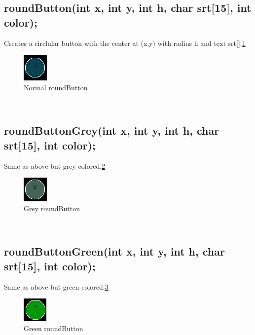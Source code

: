 \documentclass{article}
\begin{document}
\subsection{roundButton(int x, int y, int h, char srt[15], int color);}
Creates a circlular button with the center at (x,y) with radius h and text srt[].\ref{roundbutton}\\
\begin{figure}[htp]
  \begin{center}
\includegraphics[]{roundbutton}
  \end{center}
  \caption{Normal roundButton}
\label{roundbutton}
\end{figure}\\

\subsection{roundButtonGrey(int x, int y, int h, char srt[15], int color);}
Same as above but grey colored.\ref{roundbuttongrey}\\
\begin{figure}[htp]
  \begin{center}
\includegraphics[]{roundbuttongrey}
  \end{center}
  \caption{Grey roundButton}
\label{roundbuttongrey}
\end{figure}\\

\subsection{roundButtonGreen(int x, int y, int h, char srt[15], int color);}
Same as above but green colored.\ref{roundbuttongreen}\\
\begin{figure}[htp]
  \begin{center}
\includegraphics[]{roundbuttongreen}
  \end{center}
  \caption{Green roundButton}
\label{roundbuttongreen}
\end{figure}\\
\end{document}
